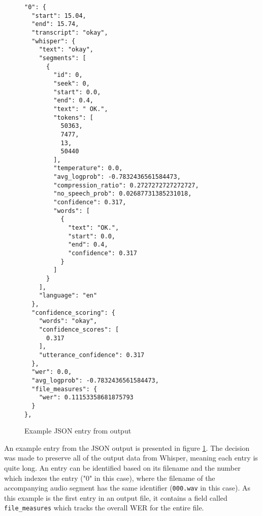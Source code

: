 \begin{figure}[p]
\centering
\begin{BVerbatim}
"0": {
  "start": 15.04,
  "end": 15.74,
  "transcript": "okay",
  "whisper": {
    "text": "okay",
    "segments": [
      {
        "id": 0,
        "seek": 0,
        "start": 0.0,
        "end": 0.4,
        "text": " OK.",
        "tokens": [
          50363,
          7477,
          13,
          50440
        ],
        "temperature": 0.0,
        "avg_logprob": -0.7832436561584473,
        "compression_ratio": 0.2727272727272727,
        "no_speech_prob": 0.02687731385231018,
        "confidence": 0.317,
        "words": [
          {
            "text": "OK.",
            "start": 0.0,
            "end": 0.4,
            "confidence": 0.317
          }
        ]
      }
    ],
    "language": "en"
  },
  "confidence_scoring": {
    "words": "okay",
    "confidence_scores": [
      0.317
    ],
    "utterance_confidence": 0.317
  },
  "wer": 0.0,
  "avg_logprob": -0.7832436561584473,
  "file_measures": {
    "wer": 0.11153358681875793
  }
},
\end{BVerbatim}
  \caption{Example JSON entry from output}
  \label{fig:json-output-example}
\end{figure}

An example entry from the JSON output is presented in figure \ref{fig:json-output-example}.
The decision was made to preserve all of the output data from Whisper, meaning each entry is quite long.
An entry can be identified based on its filename and the number which indexes the entry ("0" in this case), where the filename of the accompanying audio segment has the same identifier (\texttt{000.wav} in this case).
As this example is the first entry in an output file, it contains a field called \texttt{file\_measures} which tracks the overall WER for the entire file.

